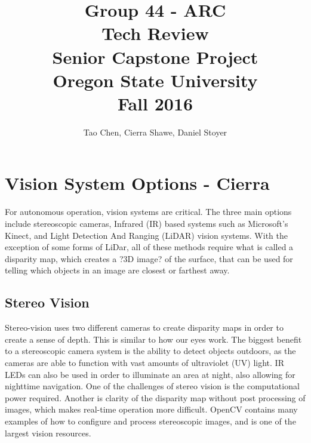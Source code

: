\documentclass[compsoc,draftclsnofoot,onecolumn,10pt]{IEEEtran}
\begin{document}
\begin{titlepage}
\title{
Group 44 - ARC \\
Tech Review\\
\LARGE
Senior Capstone Project\\
Oregon State University\\
Fall 2016
}

\author{Tao Chen, Cierra Shawe, Daniel Stoyer}
\maketitle

\begin{abstract}

\end{abstract}

\thispagestyle{empty} %

\end{titlepage}
\newpage

\tableofcontents

\newpage

\section{Vision System Options - Cierra}
For autonomous operation, vision systems are critical. 
The three main options include stereoscopic cameras, Infrared (IR) based systems such as Microsoft's Kinect, and Light Detection And Ranging (LiDAR) vision systems. 
With the exception of some forms of LiDar, all of these methods require what is called a disparity map, which creates a ?3D image? of the surface, that can be used for telling which objects in an image are closest or farthest away. 

\subsection{Stereo Vision}
Stereo-vision uses two different cameras to create disparity maps in order to create a sense of depth. 
This is similar to how our eyes work. 
The biggest benefit to a stereoscopic camera system is the ability to detect objects outdoors, as the cameras are able to function with vast amounts of ultraviolet (UV) light. 
IR LEDs can also be used in order to illuminate an area at night, also allowing for nighttime navigation. 
One of the challenges of stereo vision is the computational power required. 
Another is clarity of the disparity map without post processing of images, which makes real-time operation more difficult. \cite{acs}
OpenCV \cite{opencv} contains many examples of how to configure and process stereoscopic images, and is one of the largest vision resources. 
\end{document}
